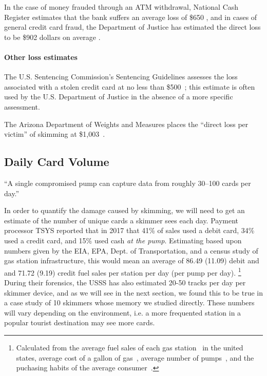 In the case of money frauded through an ATM withdrawal, National Cash Register estimates that the bank suffers an
average loss of \$650 \cite{rippleshot}, and in cases of general credit card fraud, the Department of Justice has
estimated the direct loss to be \$902 dollars on average \cite{harrell2017}.

\paragraph{Other loss estimates}
The U.S. Sentencing Commission's Sentencing Guidelines assesses the loss associated with a stolen credit card at no less
than \$500~\cite[\S2B1.1]{ussc-guidelines}; this estimate is often used by the U.S. Department of Justice in the absence
of a more specific assessment. 

The Arizona Department of Weights and Measures places the ``direct loss per victim'' of skimming at
\$1,003~\cite{arizonareport}.


\subsection{Daily Card Volume}
\label{sec:cardvol}

``A single compromised pump can capture data from roughly 30--100 cards per day.''~\cite{rippleshot}


In order to quantify the damage caused by skimming, we will need to get an estimate of the number of unique cards a
skimmer sees each day.
%
Payment processor TSYS reported that in 2017 that 41\% of sales used a debit card, 34\% used a credit card, and 15\%
used cash \textit{at the pump}. \cite{TSYS}
%
Estimating based upon numbers given by the EIA, EPA, Dept. of Transportation, and a census study of gas station
infrastructure, this would mean an average of 86.49 (11.09) debit and and 71.72 (9.19) credit fuel sales per station
per day (per pump per day).
\footnote{Calculated from the average fuel sales of each gas station~\cite{NACS} in the united states,
average cost of a gallon of gas~\cite{EIAgasPrices}, average number of pumps~\cite{basker2017customer},
and the puchasing habits of the average consumer~\cite{EPAFuelEfficiency, averageDriveDeptOfTrans}.}
During their forensics, the USSS has also estimated 20-50 tracks per day per skimmer device, and as we will see in
the next section, we found this to be true in a case study of 10 skimmers whose memory we studied directly.
%
These numbers will vary depending on the environment, i.e. a more frequented station in a popular tourist destination
may see more cards.


